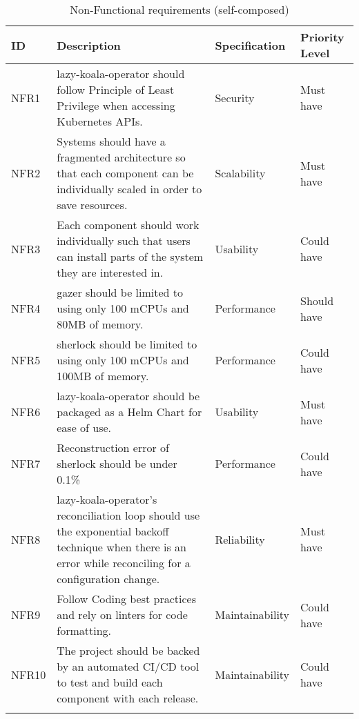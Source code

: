\begin{longtable}{|p{13mm}|p{89mm}|p{26mm}|p{18mm}|}
\hline
    \textbf{ID} &
    \textbf{Description} &
    \textbf{Specification} &
    \textbf{Priority Level} \\ \hline
    
    NFR1 &
    \ac{lazy-koala-operator} should follow Principle of Least Privilege when accessing Kubernetes APIs. &
    Security &
    Must have \\ \hline
    
    NFR2 &
    Systems should have a fragmented architecture so that each component can be individually scaled in order to save resources. &
    Scalability &
    Must have \\ \hline
    
    NFR3 &
    Each component should work individually such that users can install parts of the system they are interested in. &
    Usability &
    Could have \\ \hline
    
    NFR4 &
    \ac{gazer} should be limited to using only 100 mCPUs and 80MB of memory. &
    Performance &
    Should have \\ \hline
    
    NFR5 &
    \ac{sherlock} should be limited to using only 100 mCPUs and 100MB of memory. &
    Performance &
    Could have \\ \hline
    
    NFR6 &
    \ac{lazy-koala-operator} should be packaged as a Helm Chart for ease of use. &
    Usability &
    Must have \\ \hline
    
    NFR7 &
    Reconstruction error of \ac{sherlock} should be under 0.1\% &
    Performance &
    Could have \\ \hline
    
    NFR8 &
    \ac{lazy-koala-operator}’s reconciliation loop should use the exponential backoff technique when there is an error while reconciling for a configuration change. &
    Reliability &
    Must have \\ \hline
    
    NFR9 &
    Follow Coding best practices and rely on linters for code formatting. &
    Maintainability &
    Could have \\ \hline
    
    NFR10 &
    The project should be backed by an automated CI/CD tool to test and build each component with each release. &
    Maintainability &
    Could have \\ \hline

\caption{Non-Functional requirements (self-composed)}
\end{longtable}